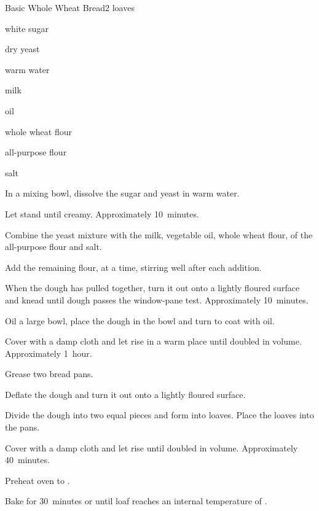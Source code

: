 \begin{recipe}{Basic Whole Wheat Bread}{}{2 loaves}

\begin{ingredients}
\item {} white sugar
\item {} dry yeast
\item \C{\threequarter} warm water
\item \C{\quarter} milk
\item {} oil
\item {} whole wheat flour
\item {} all-purpose flour
\item {} salt
\end{ingredients}

\begin{directions}
\item In a mixing bowl, dissolve the sugar and yeast in warm water.
\item Let stand until creamy. Approximately 10~minutes.
\item Combine the yeast mixture with the milk, vegetable oil, whole wheat flour,  of the all-purpose flour and salt.
\item Add the remaining flour, \C{\half} at a time, stirring well after each addition.
\item When the dough has pulled together, turn it out onto a lightly floured surface and knead until dough passes the window-pane test. Approximately 10~minutes.
\item Oil a large bowl, place the dough in the bowl and turn to coat with oil.
\item Cover with a damp cloth and let rise in a warm place until doubled in volume. Approximately 1~hour.
\item Grease two bread pans.
\item Deflate the dough and turn it out onto a lightly floured surface.
\item Divide the dough into two equal pieces and form into loaves. Place the loaves into the pans.
\item Cover with a damp cloth and let rise until doubled in volume. Approximately 40~minutes.
\item Preheat oven to .
\item Bake for 30~minutes or until loaf reaches an internal temperature of .
\end{directions}
\end{recipe}
